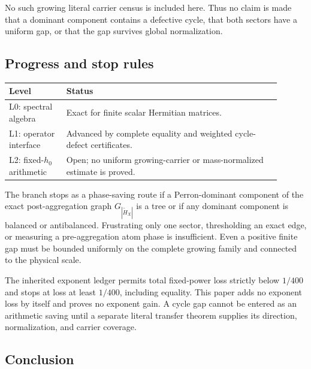 No such growing literal carrier census is included here.  Thus no claim
is made that a dominant component contains a defective cycle, that both
sectors have a uniform gap, or that the gap survives global
normalization.

\subsection*{Progress and stop rules}

\begin{center}
\begin{tabular}{@{}>{\raggedright\arraybackslash}p{0.19\linewidth}
>{\raggedright\arraybackslash}p{0.71\linewidth}@{}}
\toprule
Level & Status\\
\midrule
L0: spectral algebra &
Exact for finite scalar Hermitian matrices.\\
L1: operator interface &
Advanced by complete equality and weighted cycle-defect certificates.\\
L2: fixed-\(h_0\) arithmetic &
Open; no uniform growing-carrier or mass-normalized estimate is proved.\\
\bottomrule
\end{tabular}
\end{center}

The branch stops as a phase-saving route if a Perron-dominant component
of the exact post-aggregation graph \(G_{|\widetilde H_X|}\) is a tree
or if any dominant component is balanced or antibalanced.  Frustrating
only one sector, thresholding an exact edge, or measuring a
pre-aggregation atom phase is insufficient.  Even a positive finite
gap must be bounded uniformly on the complete growing family and
connected to the physical scale.

The inherited exponent ledger permits total fixed-power loss strictly
below \(1/400\) and stops at loss at least \(1/400\), including
equality.  This paper adds no exponent loss by itself and proves no
exponent gain.  A cycle gap cannot be entered as an arithmetic saving
until a separate literal transfer theorem supplies its direction,
normalization, and carrier coverage.

\subsection*{Conclusion}

